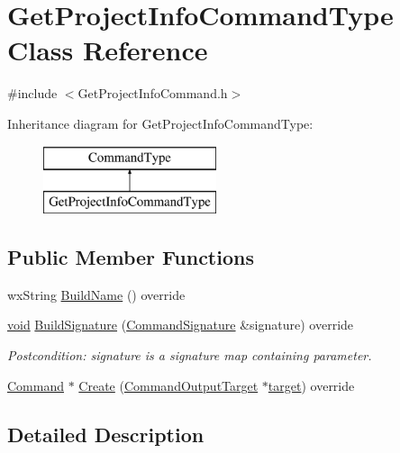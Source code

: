 \hypertarget{class_get_project_info_command_type}{}\section{Get\+Project\+Info\+Command\+Type Class Reference}
\label{class_get_project_info_command_type}


{\ttfamily \#include $<$Get\+Project\+Info\+Command.\+h$>$}

Inheritance diagram for Get\+Project\+Info\+Command\+Type\+:\begin{figure}[H]
\begin{center}
\leavevmode
\includegraphics[height=2.000000cm]{class_get_project_info_command_type}
\end{center}
\end{figure}
\subsection*{Public Member Functions}
\begin{DoxyCompactItemize}
\item 
wx\+String \hyperlink{class_get_project_info_command_type_a28584e4e6aa41528d25b1b9720620f72}{Build\+Name} () override
\item 
\hyperlink{sound_8c_ae35f5844602719cf66324f4de2a658b3}{void} \hyperlink{class_get_project_info_command_type_ae6b3ecca8e010c97731e13d89120e8c5}{Build\+Signature} (\hyperlink{class_command_signature}{Command\+Signature} \&signature) override
\begin{DoxyCompactList}\small\item\em Postcondition\+: signature is a \textquotesingle{}signature\textquotesingle{} map containing parameter. \end{DoxyCompactList}\item 
\hyperlink{class_command}{Command} $\ast$ \hyperlink{class_get_project_info_command_type_a56adfe5de52bcca7585c985aa8996ad7}{Create} (\hyperlink{class_command_output_target}{Command\+Output\+Target} $\ast$\hyperlink{lib_2expat_8h_a15a257516a87decb971420e718853137}{target}) override
\end{DoxyCompactItemize}


\subsection{Detailed Description}


